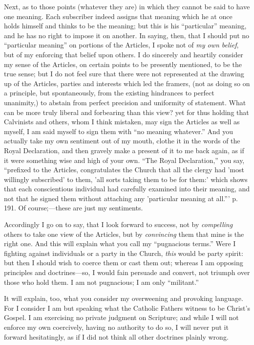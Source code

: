 Next, as to those points (whatever they are) in
which they cannot be said to have one meaning. Each subscriber indeed
assigns that meaning which he at once holds himself and thinks to be
the meaning; but this is his ``particular'' meaning, and he has no right
to impose it on another. In saying, then, that I should put no ``particular
meaning'' on portions of the Articles, I spoke not of \emph{my own belief},
but of my enforcing that belief upon others. I do sincerely and
heartily consider my sense of the Articles, on certain points to be
presently mentioned, to be the true sense; but I do not feel
sure that there were not represented at the drawing up of the
Articles, parties and interests which led the framers, (not as doing
so on a principle, but spontaneously, from the existing hindrances to
perfect unanimity,) to abstain from perfect precision and uniformity
of statement. What can be more truly liberal and forbearing than this
view? yet for thus holding that Calvinists and others, whom I think
mistaken, may sign the Articles as well as myself, I am said myself to
sign them with ``no meaning whatever.'' And you actually take my own
sentiment out of my mouth, clothe it in the words of the Royal
Declaration, and then gravely make a present of it to me back again,
as if it were something wise and high of your own. ``The Royal
Declaration,'' you say, ``prefixed to the Articles, congratulates the
Church that all the clergy had 'most willingly subscribed' to them,
'all sorts taking them to be for them:' which shows that each
conscientious individual had carefully examined into their meaning,
and not that he signed them without attaching any 'particular meaning
at all.''' p. 191. Of course;—these are just my sentiments.

Accordingly I go on to say, that I look forward
to success, not by \emph{compelling} others to take one view of the
Articles, but by \emph{convincing} them that mine is the right one.
And this will explain what you call my ``pugnacious terms.'' Were I
fighting against individuals or a party in the Church, \emph{this}
would be party spirit: but then I should wish to coerce them or cast
them out; whereas I am opposing principles and doctrines—so, I would
fain persuade and convert, not triumph over those who hold them. I am
not pugnacious; I am only ``militant.''

It will explain, too, what you consider my
overweening and provoking language. For I consider I am but speaking
what the Catholic Fathers witness to be Christ's Gospel. I am
exercising no private judgment on Scripture; and while I will
not enforce my own coercively, having no authority to do so, I will
never put it forward hesitatingly, as if I did not think all other
doctrines plainly wrong.

